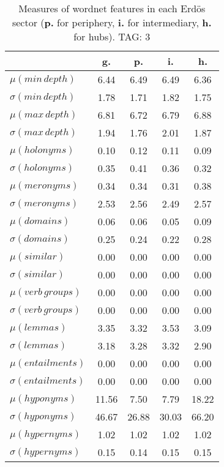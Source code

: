 \begin{table}[h!]
\begin{center}
\begin{tabular}{| l || c | c | c | c |}\hline
 & {\bf g.} & {\bf p.} & {\bf i.} & {\bf h.} \\\hline\hline
$\mu(min\,depth)$ & 6.44  & 6.49  & 6.49  & 6.36 \\
$\sigma(min\,depth)$ & 1.78  & 1.71  & 1.82  & 1.75 \\\hline
$\mu(max\,depth)$ & 6.81  & 6.72  & 6.79  & 6.88 \\
$\sigma(max\,depth)$ & 1.94  & 1.76  & 2.01  & 1.87 \\\hline
$\mu(holonyms)$ & 0.10  & 0.12  & 0.11  & 0.09 \\
$\sigma(holonyms)$ & 0.35  & 0.41  & 0.36  & 0.32 \\\hline
$\mu(meronyms)$ & 0.34  & 0.34  & 0.31  & 0.38 \\
$\sigma(meronyms)$ & 2.53  & 2.56  & 2.49  & 2.57 \\\hline
$\mu(domains)$ & 0.06  & 0.06  & 0.05  & 0.09 \\
$\sigma(domains)$ & 0.25  & 0.24  & 0.22  & 0.28 \\\hline
$\mu(similar)$ & 0.00  & 0.00  & 0.00  & 0.00 \\
$\sigma(similar)$ & 0.00  & 0.00  & 0.00  & 0.00 \\\hline
$\mu(verb\,groups)$ & 0.00  & 0.00  & 0.00  & 0.00 \\
$\sigma(verb\,groups)$ & 0.00  & 0.00  & 0.00  & 0.00 \\\hline
$\mu(lemmas)$ & 3.35  & 3.32  & 3.53  & 3.09 \\
$\sigma(lemmas)$ & 3.18  & 3.28  & 3.32  & 2.90 \\\hline
$\mu(entailments)$ & 0.00  & 0.00  & 0.00  & 0.00 \\
$\sigma(entailments)$ & 0.00  & 0.00  & 0.00  & 0.00 \\\hline
$\mu(hyponyms)$ & 11.56  & 7.50  & 7.79  & 18.22 \\
$\sigma(hyponyms)$ & 46.67  & 26.88  & 30.03  & 66.20 \\\hline
$\mu(hypernyms)$ & 1.02  & 1.02  & 1.02  & 1.02 \\
$\sigma(hypernyms)$ & 0.15  & 0.14  & 0.15  & 0.15 \\\hline
\end{tabular}
\caption{Measures of wordnet features in each Erd\"os sector ({{\bf p.}} for periphery, {{\bf i.}} for intermediary, {{\bf h.}} for hubs). TAG: 3}
\end{center}
\end{table}